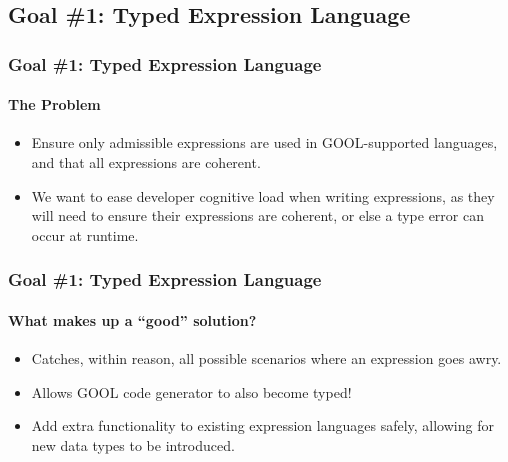 \documentclass{beamer}
\begin{document}
\subsection{Goal \#1: Typed Expression Language}

\begin{frame}
    \frametitle{Goal \#1: Typed Expression Language}
    \framesubtitle{The Problem}
    
    \begin{itemize}
        \item<2-> Ensure only admissible expressions are used in GOOL-supported languages, and that all expressions are coherent.
        \item<3-> We want to ease developer cognitive load when writing expressions, as they will need to ensure their expressions are coherent, or else a type error can occur at runtime.
    \end{itemize}
\end{frame}

\begin{frame}
    \frametitle{Goal \#1: Typed Expression Language}
    \framesubtitle{What makes up a ``good'' solution?}
    
    \begin{itemize}
        \item<2-> Catches, within reason, all possible scenarios where an expression goes awry.
        \item<3-> Allows GOOL code generator to also become typed!
        \item<4-> Add extra functionality to existing expression languages safely, allowing for new data types to be introduced.
    \end{itemize}
\end{frame}
\end{document}
